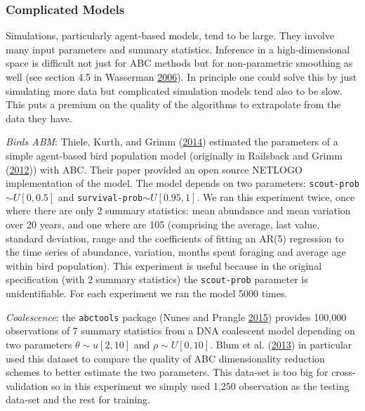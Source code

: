 \documentclass[]{article}
\begin{document}
\hypertarget{complicated-models}{%
\subsubsection{Complicated Models}\label{complicated-models}}

Simulations, particularly agent-based models, tend to be large. They involve many input parameters and summary statistics.
Inference in a high-dimensional space is difficult not just for ABC methods but for non-parametric smoothing as well (see section 4.5 in Wasserman \protect\hyperlink{ref-Wasserman2006}{2006}).
In principle one could solve this by just simulating more data but complicated simulation models tend also to be slow.
This puts a premium on the quality of the algorithms to extrapolate from the data they have.

\emph{Birds ABM}: Thiele, Kurth, and Grimm (\protect\hyperlink{ref-Thiele2014}{2014}) estimated the parameters of a simple agent-based bird population model (originally in Railsback and Grimm (\protect\hyperlink{ref-Railsback2011}{2012})) with ABC. Their paper provided an open source NETLOGO implementation of the model. The model depends on two parameters: \texttt{scout-prob}\(\sim U[0,0.5]\) and \texttt{survival-prob}\(\sim U[0.95,1]\). We ran this experiment twice, once where there are only 2 summary statistics: mean abundance and mean variation over 20 years, and one where are 105 (comprising the average, last value, standard deviation, range and the coefficients of fitting an AR(5) regression to the time series of abundance, variation, months spent foraging and average age within bird population).
This experiment is useful because in the original specification (with 2 summary statistics) the \texttt{scout-prob} parameter is unidentifiable.
For each experiment we ran the model 5000 times.

\emph{Coalescence}: the \texttt{abctools} package (Nunes and Prangle \protect\hyperlink{ref-Nunes2015}{2015}) provides 100,000 observations of 7 summary statistics from a DNA coalescent model depending on two parameters \(\theta \sim u[2,10]\) and \(\rho \sim U[0,10]\). Blum et al. (\protect\hyperlink{ref-Blum2013}{2013}) in particular used this dataset to compare the quality of ABC dimensionality reduction schemes to better estimate the two parameters.
This data-set is too big for cross-validation so in this experiment we simply used 1,250 observation as the testing data-set and the rest for training.
\end{document}
